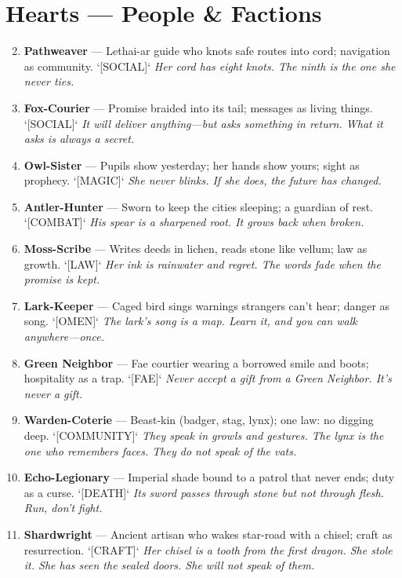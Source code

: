 \section*{Hearts --- People \& Factions}
\label{sec:valewood-people}
\begin{enumerate}
\setcounter{enumi}{1}
\item \textbf{Pathweaver} --- Lethai-ar guide who knots safe routes into cord; navigation as community. `[SOCIAL]`
  \hfill \textit{Her cord has eight knots. The ninth is the one she never ties.}
\item \textbf{Fox-Courier} --- Promise braided into its tail; messages as living things. `[SOCIAL]`
  \hfill \textit{It will deliver anything---but asks something in return. What it asks is always a secret.}
\item \textbf{Owl-Sister} --- Pupils show yesterday; her hands show yours; sight as prophecy. `[MAGIC]`
  \hfill \textit{She never blinks. If she does, the future has changed.}
\item \textbf{Antler-Hunter} --- Sworn to keep the cities sleeping; a guardian of rest. `[COMBAT]`
  \hfill \textit{His spear is a sharpened root. It grows back when broken.}
\item \textbf{Moss-Scribe} --- Writes deeds in lichen, reads stone like vellum; law as growth. `[LAW]`
  \hfill \textit{Her ink is rainwater and regret. The words fade when the promise is kept.}
\item \textbf{Lark-Keeper} --- Caged bird sings warnings strangers can't hear; danger as song. `[OMEN]`
  \hfill \textit{The lark's song is a map. Learn it, and you can walk anywhere---once.}
\item \textbf{Green Neighbor} --- Fae courtier wearing a borrowed smile and boots; hospitality as a trap. `[FAE]`
  \hfill \textit{Never accept a gift from a Green Neighbor. It's never a gift.}
\item \textbf{Warden-Coterie} --- Beast-kin (badger, stag, lynx); one law: no digging deep. `[COMMUNITY]`
  \hfill \textit{They speak in growls and gestures. The lynx is the one who remembers faces. They do not speak of the vats.}
\item \textbf{Echo-Legionary} --- Imperial shade bound to a patrol that never ends; duty as a curse. `[DEATH]`
  \hfill \textit{Its sword passes through stone but not through flesh. Run, don't fight.}
\item[J] \textbf{Shardwright} --- Ancient artisan who wakes star-road with a chisel; craft as resurrection. `[CRAFT]`
  \hfill \textit{Her chisel is a tooth from the first dragon. She stole it. She has seen the sealed doors. She will not speak of them.}

\end{enumerate}
